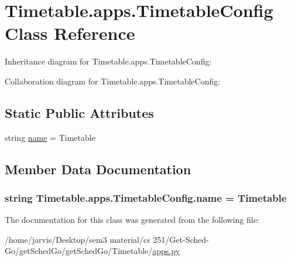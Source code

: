 \hypertarget{classTimetable_1_1apps_1_1TimetableConfig}{}\section{Timetable.\+apps.\+Timetable\+Config Class Reference}
\label{classTimetable_1_1apps_1_1TimetableConfig}


Inheritance diagram for Timetable.\+apps.\+Timetable\+Config\+:


Collaboration diagram for Timetable.\+apps.\+Timetable\+Config\+:
\subsection*{Static Public Attributes}
\begin{DoxyCompactItemize}
\item 
string \hyperlink{classTimetable_1_1apps_1_1TimetableConfig_a5e2f67809f3525ce1ca8c41a9fb83d6a}{name} = \textquotesingle{}Timetable\textquotesingle{}
\end{DoxyCompactItemize}


\subsection{Member Data Documentation}
\subsubsection[{\texorpdfstring{name}{name}}]{\setlength{\rightskip}{0pt plus 5cm}string Timetable.\+apps.\+Timetable\+Config.\+name = \textquotesingle{}Timetable\textquotesingle{}\hspace{0.3cm}{\ttfamily [static]}}\hypertarget{classTimetable_1_1apps_1_1TimetableConfig_a5e2f67809f3525ce1ca8c41a9fb83d6a}{}\label{classTimetable_1_1apps_1_1TimetableConfig_a5e2f67809f3525ce1ca8c41a9fb83d6a}


The documentation for this class was generated from the following file\+:\begin{DoxyCompactItemize}
\item 
/home/jarvis/\+Desktop/sem3 material/cs 251/\+Get-\/\+Sched-\/\+Go/get\+Sched\+Go/get\+Sched\+Go/\+Timetable/\hyperlink{Timetable_2apps_8py}{apps.\+py}\end{DoxyCompactItemize}

